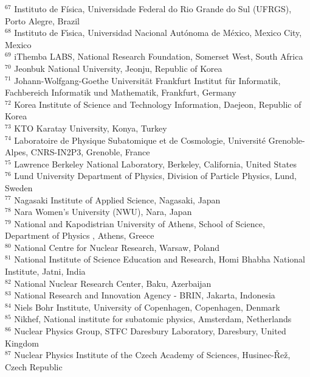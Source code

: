 \begin{flushleft}
$^{67}$ Instituto de F\'{i}sica, Universidade Federal do Rio Grande do Sul (UFRGS), Porto Alegre, Brazil\\
$^{68}$ Instituto de F\'{\i}sica, Universidad Nacional Aut\'{o}noma de M\'{e}xico, Mexico City, Mexico\\
$^{69}$ iThemba LABS, National Research Foundation, Somerset West, South Africa\\
$^{70}$ Jeonbuk National University, Jeonju, Republic of Korea\\
$^{71}$ Johann-Wolfgang-Goethe Universit\"{a}t Frankfurt Institut f\"{u}r Informatik, Fachbereich Informatik und Mathematik, Frankfurt, Germany\\
$^{72}$ Korea Institute of Science and Technology Information, Daejeon, Republic of Korea\\
$^{73}$ KTO Karatay University, Konya, Turkey\\
$^{74}$ Laboratoire de Physique Subatomique et de Cosmologie, Universit\'{e} Grenoble-Alpes, CNRS-IN2P3, Grenoble, France\\
$^{75}$ Lawrence Berkeley National Laboratory, Berkeley, California, United States\\
$^{76}$ Lund University Department of Physics, Division of Particle Physics, Lund, Sweden\\
$^{77}$ Nagasaki Institute of Applied Science, Nagasaki, Japan\\
$^{78}$ Nara Women{'}s University (NWU), Nara, Japan\\
$^{79}$ National and Kapodistrian University of Athens, School of Science, Department of Physics , Athens, Greece\\
$^{80}$ National Centre for Nuclear Research, Warsaw, Poland\\
$^{81}$ National Institute of Science Education and Research, Homi Bhabha National Institute, Jatni, India\\
$^{82}$ National Nuclear Research Center, Baku, Azerbaijan\\
$^{83}$ National Research and Innovation Agency - BRIN, Jakarta, Indonesia\\
$^{84}$ Niels Bohr Institute, University of Copenhagen, Copenhagen, Denmark\\
$^{85}$ Nikhef, National institute for subatomic physics, Amsterdam, Netherlands\\
$^{86}$ Nuclear Physics Group, STFC Daresbury Laboratory, Daresbury, United Kingdom\\
$^{87}$ Nuclear Physics Institute of the Czech Academy of Sciences, Husinec-\v{R}e\v{z}, Czech Republic\\

\end{flushleft}
